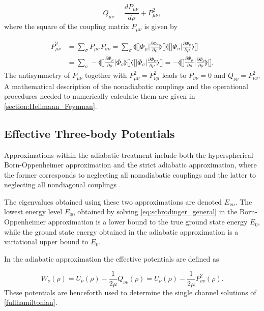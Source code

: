 \begin{equation}
Q_{\mu \nu} = \frac{dP_{\mu \nu}}{d\rho} + P^2_{\mu \nu},
\end{equation}
where the square of the coupling matrix $P_{\mu \nu}$ is given by

\begin{align}
P^2_{\mu \nu} &= \sum_{\sigma}P_{\mu \sigma}P_{\sigma \nu} = \sum_{\sigma}\llangle[\Big] \Phi_{\mu} \Big\lvert \frac{\partial \Phi_{\sigma}}{\partial\rho}  \rrangle[\Big]\llangle[\Big] \Phi_{\sigma} \Big\lvert \frac{\partial \Phi_{\nu}}{\partial\rho}  \rrangle[\Big]\nonumber\\
&=\sum_{\sigma}-\llangle[\Big]\frac{\partial \Phi_{\mu}}{\partial\rho} \Big\lvert  \Phi_{\sigma} \rrangle[\Big]\llangle[\Big] \Phi_{\sigma} \Big\lvert \frac{\partial \Phi_{\nu}}{\partial\rho}  \rrangle[\Big]=- \llangle[\Big] \frac{\partial \Phi_{\mu}}{\partial \rho}  \Big\lvert \frac{\partial \Phi_{\nu}}{\partial\rho}  \rrangle[\Big].
\end{align}
The antisymmetry of $P_{\mu\nu}$ together with $P_{\mu\nu}^2 = P_{\nu\mu}^2$ leads to $P_{\nu\nu} = 0$ and $Q_{\nu \nu} = P_{\nu\nu}^2$. A mathematical description of the nonadiabatic couplings and the operational procedures needed to numerically calculate them are given in \cref{section:Hellmann_Feynman}.

\subsection{Effective Three-body Potentials}
Approximations within the adiabatic treatment include both the hyperspherical Born-Oppenheimer approximation and the strict adiabatic approximation, where the former corresponds to neglecting all nonadiabatic couplings and the latter to neglecting all nondiagonal couplings \cite{Blume2002}. 

The eigenvalues obtained using these two approximations are denoted $E_{\nu n}$. The lowest energy level $E_{00}$ obtained by solving \eqref{eq:schrodinger_general} in the Born-Oppenheimer  approximation is a lower bound to the true ground state energy $E_0$, while the ground state energy obtained in the adiabatic approximation is a variational upper bound to $E_{0}$. 

In the adiabatic approximation the effective potentials are defined as 

\begin{equation}
W_{\nu}(\rho) = U_{\nu}(\rho)-\frac{1}{2\mu}Q_{\nu \nu}(\rho) = U_{\nu}(\rho)-\frac{1}{2\mu}P_{\nu \nu}^2(\rho).
\end{equation} 
These potentials are henceforth used to determine the single channel solutions of \eqref{fullhamiltonian}. 

